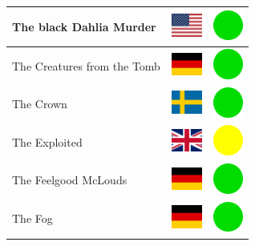 \documentclass[12pt, a4paper, twoside]{report}
\begin{document}
\begin{center}
\begin{longtable}{|p{5cm}|p{2cm}|p{2cm}|}
 The black Dahlia Murder                                    & \includegraphics[width=1cm]{../img/flags/us} &   \includegraphics[width=1cm]{../likes/y} \\ \hline
 The Creatures from the Tomb                                & \includegraphics[width=1cm]{../img/flags/de} &   \includegraphics[width=1cm]{../likes/y} \\ \hline
 The Crown                                                  & \includegraphics[width=1cm]{../img/flags/se} &   \includegraphics[width=1cm]{../likes/y} \\ \hline
 The Exploited                                              & \includegraphics[width=1cm]{../img/flags/gb} &   \includegraphics[width=1cm]{../likes/m} \\ \hline
 The Feelgood McLouds                                       & \includegraphics[width=1cm]{../img/flags/de} &   \includegraphics[width=1cm]{../likes/y} \\ \hline
 The Fog                                                    & \includegraphics[width=1cm]{../img/flags/de} &   \includegraphics[width=1cm]{../likes/y} \\ \hline

\end{longtable}
\end{center}
\end{document}
